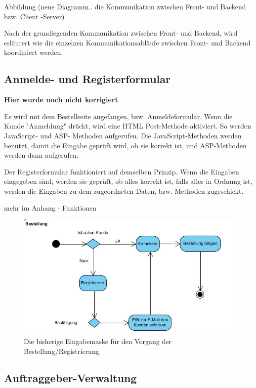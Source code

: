 Abbildung (neue Diagramm.. die Kommunikation zwischen Front- und Backend bzw. Client -Server)

Nach der grundlegenden Kommunikation zwischen Front- und Backend, wird erläutert wie die einzelnen Kommunikationsabläufe zwischen Front- und Backend koordiniert werden.

\subsection{Anmelde- und Registerformular} 

\textbf{Hier wurde noch nicht korrigiert}

Es wird mit dem Bestellseite angefangen, bzw. Anmeldeformular. Wenn die Kunde "Anmeldung" drückt, wird eine HTML Post-Methode aktiviert.  So werden JavaScript- und ASP- Methoden aufgerufen. Die JavaScript-Methoden werden benutzt, damit die Eingabe geprüft wird, ob sie korrekt ist, und ASP-Methoden werden dann aufgerufen. 

Der Registerformular funktioniert auf demselben Prinzip. Wenn die Eingaben eingegeben sind, werden sie geprüft, ob alles korrekt ist, falls alles in Ordnung ist, werden die Eingaben zu dem zugeordneten Daten, bzw. Methoden zugeschickt.

mehr im Anhang - Funktionen

\begin{figure}[h]
	\centering
	\includegraphics[width=0.9\linewidth]{Graphics/Bestellung.JPG}
	\caption[Anmeldung/Bestellung]{Die bisherige Eingabemaske für den Vorgang der Bestellung/Registrierung}
	\label{fig:Bestellung}
\end{figure}

\subsection{Auftraggeber-Verwaltung}

